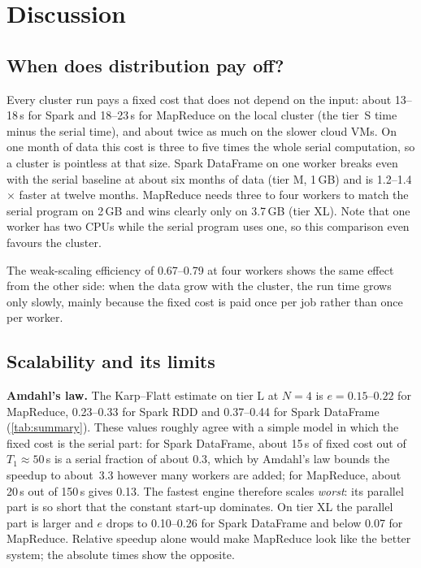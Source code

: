 \section{Discussion}\label{sec:discussion}

\subsection{When does distribution pay off?}
Every cluster run pays a fixed cost that does not depend on the input: about 13--18\,s
for Spark and 18--23\,s for MapReduce on the local cluster (the tier~S time minus the
serial time), and about twice as much on the slower cloud VMs. On one month of data
this cost is three to five times the whole serial computation, so a cluster is
pointless at that size. Spark DataFrame on one worker breaks even with the serial
baseline at about six months of data (tier M, 1\,GB) and is 1.2--1.4$\times$ faster at
twelve months. MapReduce needs three to four workers to match the serial program on 2\,GB and wins clearly only
on 3.7\,GB (tier XL). Note that one worker has two CPUs while the serial program uses
one, so this comparison even favours the cluster.

The weak-scaling efficiency of 0.67--0.79 at four workers shows the same effect from
the other side: when the data grow with the cluster, the run time grows only slowly,
mainly because the fixed cost is paid once per job rather than once per worker.

\subsection{Scalability and its limits}
\textbf{Amdahl's law.} The Karp--Flatt estimate on tier L at $N=4$ is
$e=0.15$--$0.22$ for MapReduce, 0.23--0.33 for Spark RDD and 0.37--0.44 for Spark
DataFrame (\cref{tab:summary}). These values roughly agree with a simple model in
which the fixed cost is the serial part: for Spark DataFrame, about 15\,s of fixed cost
out of $T_1\approx50$\,s is a serial fraction of about 0.3, which by Amdahl's law
bounds the speedup to about~3.3 however many workers are added; for MapReduce, about
20\,s out of 150\,s gives 0.13. The fastest engine therefore scales
\emph{worst}: its parallel part is so short that the constant start-up dominates. On
tier XL the parallel part is larger and $e$ drops to 0.10--0.26 for Spark DataFrame and
below 0.07 for MapReduce. Relative speedup alone would make MapReduce look like the
better system; the absolute times show the opposite.

